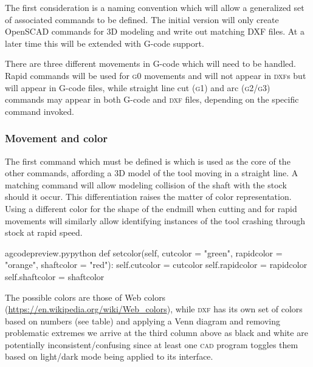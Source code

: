 \documentclass{ltxdoc}
\begin{document}
The first consideration is a naming convention which will allow a generalized set of associated commands to be defined. The initial version will only create OpenSCAD commands for 3D modeling and write out matching DXF files. At a later time this will be extended with G-code support.

There are three different movements in G-code which will need to be handled. Rapid commands will be used for \textsc{g0} movements and will not appear in \textsc{dxf}s but will appear in G-code files, while straight line cut (\textsc{g1}) and arc (\textsc{g2/g3}) commands may appear in both G-code and \textsc{dxf} files, depending on the specific command invoked. 

\subsubsection{Movement and color}

The first command which must be defined is  which is used as the core of the other commands, affording a 3D model of the tool moving in a straight line. A matching  command will allow modeling collision of the shaft with the stock should it occur. This differentiation raises the matter of color representation. Using a different color for the shape of the endmill when cutting and for rapid movements will similarly allow identifying instances of the tool crashing through stock at rapid speed.

\lstset{firstnumber=\thegcpy}
\begin{writecode}{a}{gcodepreview.py}{python}
    def setcolor(self, 
                  cutcolor = "green",
                  rapidcolor = "orange",
                  shaftcolor = "red"):
        self.cutcolor = cutcolor
        self.rapidcolor = rapidcolor
        self.shaftcolor = shaftcolor

\end{writecode}
\addtocounter{gcpy}{8}

The possible colors are those of Web colors (\url{https://en.wikipedia.org/wiki/Web_colors}), while \textsc{dxf} has its own set of colors based on numbers (see table) and applying a Venn diagram and removing problematic extremes we arrive at the third column above as black and white are potentially inconsistent/confusing since at least one \textsc{cad} program toggles them based on light/dark mode being applied to its interface.
\end{document}
